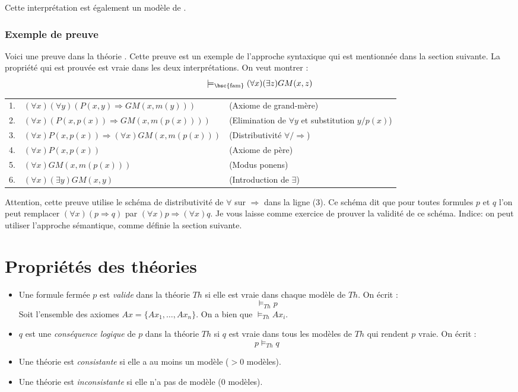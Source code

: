{Cette interprétation est également un modèle de .

\subsubsection{Exemple de preuve}

Voici une preuve dans la théorie .
Cette preuve est un exemple de l'approche syntaxique qui est mentionnée dans la section suivante.
La propriété qui est prouvée est vraie dans les deux interprétations.
On veut montrer  : 
$$\models_{\text{\bsc{fam}}} (\forall x)(\exists z) GM(x,z)$$

\begin{tabular}{lll}
1.&$(\forall x)(\forall y) \left(P(x,y)\Rightarrow GM(x, m(y)) \right)$&(Axiome de grand-mère)\\
2.&$(\forall x) \left(P(x,p(x))\Rightarrow GM(x, m(p(x))) \right)$&(Elimination de $\forall y$ et substitution $y/p(x)$)\\
3.&$(\forall x) P(x,p(x)) \Rightarrow (\forall x) GM(x,m(p(x)))$& (Distributivité $\forall/\Rightarrow$)\\
4.&$(\forall x) P(x,p(x))$ & (Axiome de père) \\
5.&$(\forall x) GM(x,m(p(x)))$&(Modus ponens)\\
6.&$(\forall x) (\exists y) GM(x,y)$&(Introduction de $\exists$)\\
\end{tabular}

Attention, cette preuve utilise le schéma de distributivité de $\forall$ sur $\Rightarrow$
dans la ligne (3).
Ce schéma dit que pour toutes formules $p$ et $q$
l'on peut remplacer $(\forall x) (p \Rightarrow q)$
par $(\forall x) p \Rightarrow (\forall x) q$.
Je vous laisse comme exercice de prouver la validité de ce schéma.
Indice: on peut utiliser l'approche sémantique, comme définie la section suivante.

\section{Propriétés des théories}

\begin{itemize}
\item Une formule fermée $p$ est \textit{valide} dans la théorie $Th$ si elle est vraie dans chaque modèle de $Th$. On écrit : 
$$\models_{Th} p$$
Soit l'ensemble des axiomes $Ax=\{Ax_1, \hdots, Ax_n\}$. On a bien que $\models_{Th} Ax_i$.\\
\item $q$ est une \textit{conséquence logique} de $p$ dans la théorie $Th$
si $q$ est vraie dans tous les modèles de $Th$ qui rendent $p$ vraie.
On écrit :  $$p \models_{Th} q$$
\item Une théorie est \textit{consistante} si elle a au moins un modèle ($>0$ modèles).
\item Une théorie est \textit{inconsistante} si elle n'a pas de modèle ($0$ modèles).\\
\end{itemize}

}
